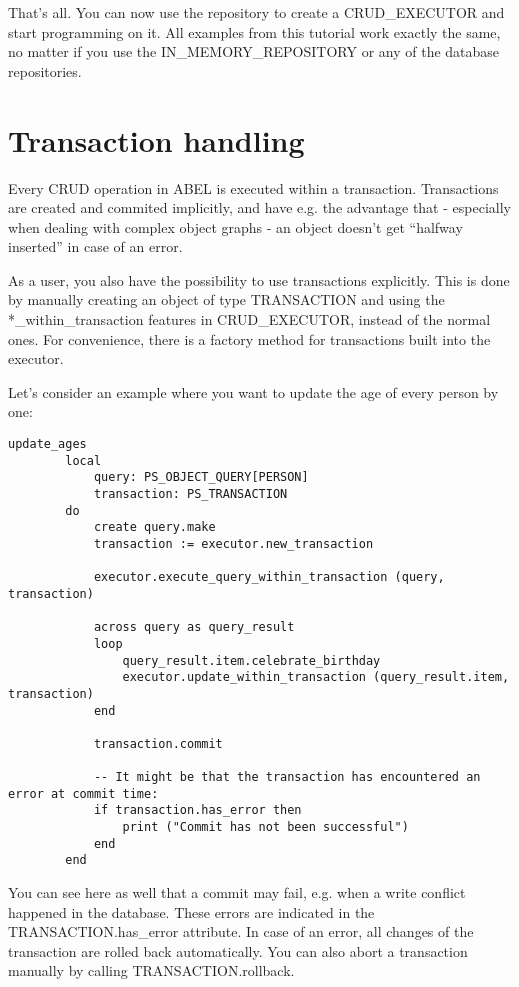 That's all. You can now use the repository to create a CRUD\_EXECUTOR and start programming on it.
All examples from this tutorial work exactly the same, no matter if you use the IN\_MEMORY\_REPOSITORY or any of the database repositories.


\section{Transaction handling}

Every CRUD operation in ABEL is executed within a transaction. 
Transactions are created and commited implicitly, and have e.g. the advantage that - especially when dealing with complex object graphs - an object doesn't get ``halfway inserted'' in case of an error.

As a user, you also have the possibility to use transactions explicitly. 
This is done by manually creating an object of type TRANSACTION and using the *\_within\_transaction features in CRUD\_EXECUTOR, instead of the normal ones.
For convenience, there is a factory method for transactions built into the executor.

Let's consider an example where you want to update the age of every person by one:

\begin{lstlisting}[language=OOSC2Eiffel, captionpos=b, caption={}, label={lst:update_all_ages}]
	update_ages
		local
			query: PS_OBJECT_QUERY[PERSON]
			transaction: PS_TRANSACTION
		do
			create query.make
			transaction := executor.new_transaction

			executor.execute_query_within_transaction (query, transaction)

			across query as query_result
			loop
				query_result.item.celebrate_birthday
				executor.update_within_transaction (query_result.item, transaction)
			end

			transaction.commit

			-- It might be that the transaction has encountered an error at commit time:
			if transaction.has_error then
				print ("Commit has not been successful")
			end
		end
\end{lstlisting}

You can see here as well that a commit may fail, e.g. when a write conflict happened in the database.
These errors are indicated in the TRANSACTION.has\_error attribute.
In case of an error, all changes of the transaction are rolled back automatically.
You can also abort a transaction manually by calling TRANSACTION.rollback. 

